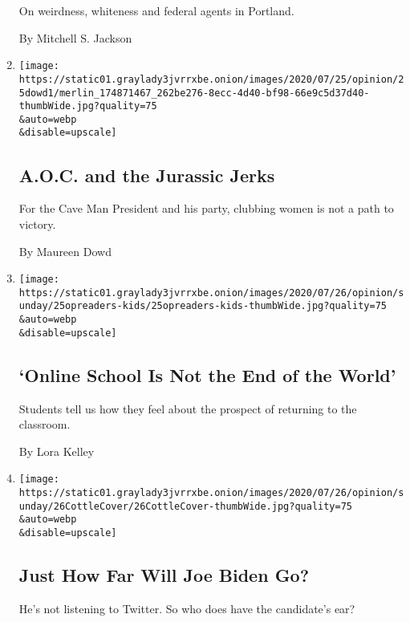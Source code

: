 \begin{enumerate}
  On weirdness, whiteness and federal agents in Portland.

  By Mitchell S. Jackson
\item
  \href{/2020/07/25/opinion/sunday/aoc-yoho-trump-2020.html}{}

  \texttt{[image: https://static01.graylady3jvrrxbe.onion/images/2020/07/25/opinion/25dowd1/merlin\_174871467\_262be276-8ecc-4d40-bf98-66e9c5d37d40-thumbWide.jpg?quality=75\\\&auto=webp\\\&disable=upscale]}

  \hypertarget{aoc-and-the-jurassic-jerks}{%
  \subsection{A.O.C. and the Jurassic
  Jerks}\label{aoc-and-the-jurassic-jerks}}

  For the Cave Man President and his party, clubbing women is not a path
  to victory.

  By Maureen Dowd
\item
  \href{/2020/07/25/opinion/sunday/coronavirus-kids-school.html}{}

  \texttt{[image: https://static01.graylady3jvrrxbe.onion/images/2020/07/26/opinion/sunday/25opreaders-kids/25opreaders-kids-thumbWide.jpg?quality=75\\\&auto=webp\\\&disable=upscale]}

  \hypertarget{online-school-is-not-the-end-of-the-world}{%
  \subsection{`Online School Is Not the End of the
  World'}\label{online-school-is-not-the-end-of-the-world}}

  Students tell us how they feel about the prospect of returning to the
  classroom.

  By Lora Kelley
\item
  \href{/2020/07/24/opinion/sunday/joe-biden-2020.html}{}

  \texttt{[image: https://static01.graylady3jvrrxbe.onion/images/2020/07/26/opinion/sunday/26CottleCover/26CottleCover-thumbWide.jpg?quality=75\\\&auto=webp\\\&disable=upscale]}

  \hypertarget{just-how-far-will-joe-biden-go}{%
  \subsection{Just How Far Will Joe Biden
  Go?}\label{just-how-far-will-joe-biden-go}}

  He's not listening to Twitter. So who does have the candidate's ear?


\end{enumerate}
